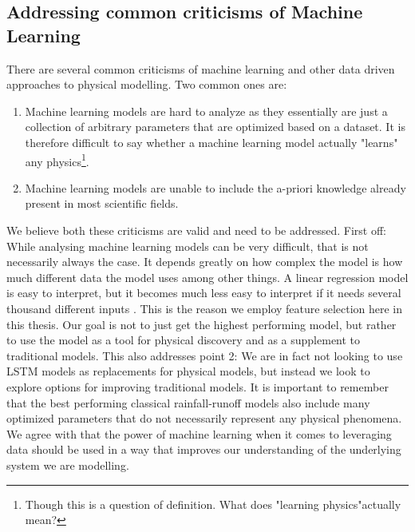 \subsection{Addressing common criticisms of Machine Learning}
There are several common criticisms of machine learning and other data driven 
approaches to physical modelling. Two common ones are:
\begin{enumerate}
    \item Machine learning models are hard to analyze as they essentially are just a collection of arbitrary parameters that are optimized based on a dataset. It is therefore difficult to say whether a machine learning model actually "learns" any physics\footnote{Though this is a question of definition. What does "learning physics"actually mean?}.
    \item Machine learning models are unable to include the a-priori knowledge 
	already present in most scientific fields.
\end{enumerate}
We believe both these criticisms are valid and need to be addressed. First off: 
While analysing machine learning models can be very difficult, that is not necessarily 
always the case. It depends greatly on how complex the model is how much different 
data the model uses among other things. A linear regression model is easy to interpret, 
but it becomes much less easy to interpret if it needs several thousand different 
inputs \citep{elemstatlearn}. This is the reason we employ feature selection here 
in this thesis. Our goal is not to just get the highest performing model, but rather 
to use the model as a tool for physical discovery and as a supplement to traditional models. This also addresses point 2: 
We are in fact not looking to use LSTM models as replacements for physical models, 
but instead we look to explore options for improving traditional models.
It is important to remember that the best performing 
classical rainfall-runoff models also include many optimized parameters 
that do not necessarily represent any physical phenomena. We agree with \citet{hybrid_paper} 
that the power of machine learning when it comes to leveraging data should be 
used in a way that improves our understanding of the underlying system we are modelling. 
